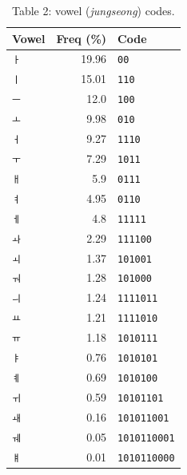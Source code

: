 \documentclass[conference]{IEEEtran}
\begin{document}
\begin{table}[H]
\centering
\small
\caption{Table 2: vowel (\emph{jungseong}) codes.}
\begin{tabular}{lrl}
\toprule
Vowel & Freq (\%) & Code \\
\midrule
\texttt{ㅏ} & 19.96 & \texttt{00} \\
\texttt{ㅣ} & 15.01 & \texttt{110} \\
\texttt{ㅡ} & 12.0 & \texttt{100} \\
\texttt{ㅗ} & 9.98 & \texttt{010} \\
\texttt{ㅓ} & 9.27 & \texttt{1110} \\
\texttt{ㅜ} & 7.29 & \texttt{1011} \\
\texttt{ㅐ} & 5.9 & \texttt{0111} \\
\texttt{ㅕ} & 4.95 & \texttt{0110} \\
\texttt{ㅔ} & 4.8 & \texttt{11111} \\
\texttt{ㅘ} & 2.29 & \texttt{111100} \\
\texttt{ㅚ} & 1.37 & \texttt{101001} \\
\texttt{ㅝ} & 1.28 & \texttt{101000} \\
\texttt{ㅢ} & 1.24 & \texttt{1111011} \\
\texttt{ㅛ} & 1.21 & \texttt{1111010} \\
\texttt{ㅠ} & 1.18 & \texttt{1010111} \\
\texttt{ㅑ} & 0.76 & \texttt{1010101} \\
\texttt{ㅖ} & 0.69 & \texttt{1010100} \\
\texttt{ㅟ} & 0.59 & \texttt{10101101} \\
\texttt{ㅙ} & 0.16 & \texttt{101011001} \\
\texttt{ㅞ} & 0.05 & \texttt{1010110001} \\
\texttt{ㅒ} & 0.01 & \texttt{1010110000} \\
\bottomrule
\end{tabular}
\end{table}
\end{document}
